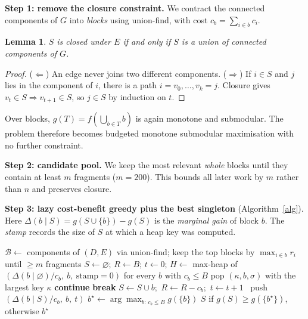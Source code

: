 \documentclass[10pt,a4paper]{article}
\newtheorem{lemma}{Lemma}
\newcommand{\cost}{c}
\begin{document}
\textbf{Step 1: remove the closure constraint.} We contract the connected components of $G$ into \emph{blocks} using union-find, with cost $\cost_b=\sum_{i\in b}\cost_i$.

\begin{lemma}
$S$ is closed under $E$ if and only if $S$ is a union of connected components of $G$.
\end{lemma}
\begin{proof}
($\Leftarrow$) An edge never joins two different components. ($\Rightarrow$) If $i\in S$ and $j$ lies in the component of $i$, there is a path $i=v_0,\dots,v_k=j$. Closure gives $v_{t}\in S\Rightarrow v_{t+1}\in S$, so $j\in S$ by induction on $t$.
\end{proof}

Over blocks, $g(T)=f(\bigcup_{b\in T}b)$ is again monotone and submodular. The problem therefore becomes budgeted monotone submodular maximisation with no further constraint.

\textbf{Step 2: candidate pool.} We keep the most relevant \emph{whole} blocks until they contain at least $m$ fragments ($m=200$). This bounds all later work by $m$ rather than $n$ and preserves closure.

\textbf{Step 3: lazy cost-benefit greedy plus the best singleton} (Algorithm~\ref{alg}). Here $\Delta(b\mid S)=g(S\cup\{b\})-g(S)$ is the \emph{marginal gain} of block $b$. The \emph{stamp} records the size of $S$ at which a heap key was computed.

\begin{algorithm}[h]
\caption{\textsc{SelectContext}$(D,\cost,r,s,E,B,m)$}\label{alg}
\small
\begin{algorithmic}[1]
\State $\mathcal{B}\gets$ components of $(D,E)$ via union-find; keep the top blocks by $\max_{i\in b} r_i$ until $\ge m$ fragments
\State $S\gets\varnothing$; $R\gets B$; $t\gets 0$; $H\gets$ max-heap of $(\Delta(b\mid\varnothing)/\cost_b,\ b,\ \text{stamp}=0)$ for every $b$ with $\cost_b\le B$
  \State pop $(\kappa,b,\sigma)$ with the largest key $\kappa$
  \If{$\cost_b>R$} \textbf{continue} 
   
      \textbf{break} \EndIf
     \State $S\gets S\cup b$;\ $R\gets R-\cost_b$;\ $t\gets t+1$
  \Else\ push $(\Delta(b\mid S)/\cost_b,\ b,\ t)$ 
  \EndIf
\EndWhile
\State $b^\star\gets\arg\max_{b:\,\cost_b\le B} g(\{b\})$ 
\State \Return $S$ if $g(S)\ge g(\{b^\star\})$, otherwise $b^\star$
\end{algorithmic}
\end{algorithm}
\end{document}
